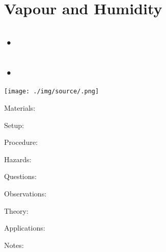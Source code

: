 \section{Vapour and Humidity}

\begin{multicols}{2}


\section*{•}




\subsection{•}

\begin{center}
\texttt{[image: ./img/source/.png]}
\end{center}

\begin{description*}
\item[Materials:]{}
\item[Setup:]{}
\item[Procedure:]{}
\item[Hazards:]{}
\item[Questions:]{}
\item[Observations:]{}
\item[Theory:]{}
\item[Applications:]{}
\item[Notes:]{}
\end{description*}



\end{multicols}

\pagebreak
